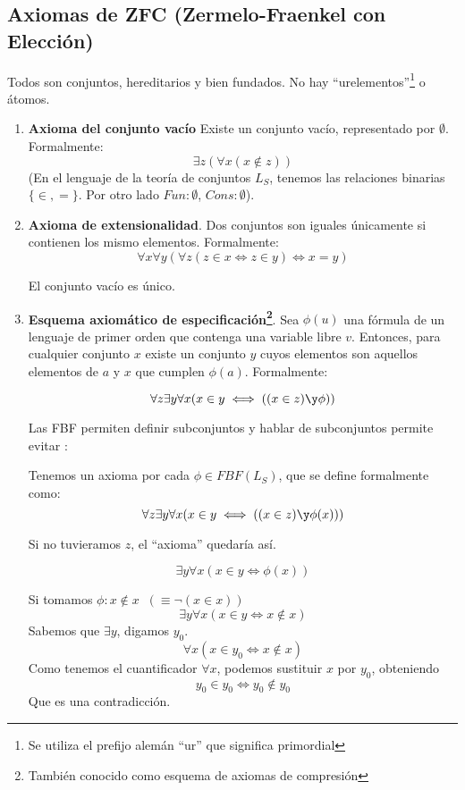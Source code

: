 \subsection{Axiomas de ZFC (Zermelo-Fraenkel con Elección)}
	Todos son conjuntos, hereditarios y bien fundados.
	No hay ``urelementos''\footnote{Se utiliza el prefijo alemán ``ur'' que significa primordial} o átomos.
	\begin{enumerate}
		\item \textbf{Axioma del conjunto vacío} Existe un conjunto vacío, representado por $\emptyset$. Formalmente:
		$$\exists z (\forall x (x\notin z))$$
		(En el lenguaje de la teoría de conjuntos $L_S$, tenemos las relaciones binarias $\{\in, =\}$. Por otro lado $Fun: \emptyset$, $Cons: \emptyset$).

		\item \textbf{Axioma de extensionalidad}.
		Dos conjuntos son iguales únicamente si contienen los mismo elementos. Formalmente:
		$$\forall x\forall y(\forall z (z\in x\iff z\in y)\iff x = y)$$
		\begin{corol}
			El conjunto vacío es único.
		\end{corol}
		
		\item \textbf{Esquema axiomático de especificación\footnote{También conocido como esquema de axiomas de compresión}}. Sea $\phi(u)$ una fórmula de un lenguaje de primer orden que contenga una variable libre $v$. Entonces, para cualquier conjunto $x$ existe un conjunto $y$ cuyos elementos son aquellos elementos de $a$ y $x$ que cumplen $\phi(a)$. Formalmente:

		\[\forall z \exists y \forall x(x\in y\iff((x\in z)\y \phi))\]

		Las FBF permiten definir subconjuntos y hablar de subconjuntos permite evitar :
		
		Tenemos un axioma por cada $\phi\in FBF(L_S)$, que se define formalmente como:
		$$\forall z \exists y \forall x(x\in y\iff((x\in z)\y \phi(x)))$$
		
		Si no tuvieramos $z$, el ``axioma'' quedaría así.
		
		$$\exists y \forall x (x\in y\iff \phi(x))$$
		
		Si tomamos $\phi: x\notin x \;\; (\equiv\neg (x\in x))$
		$$\exists y \forall x (x\in y\iff x\notin x)$$
		Sabemos que $\exists y$, digamos $y_0$.
		$$\forall x (x\in y_0 \iff x\notin x)$$ 
		Como tenemos el cuantificador $\forall x$, podemos sustituir $x$ por $y_0$, obteniendo
		$$y_0\in y_0 \iff y_0\notin y_0$$
		Que es una contradicción. 


\end{enumerate}
